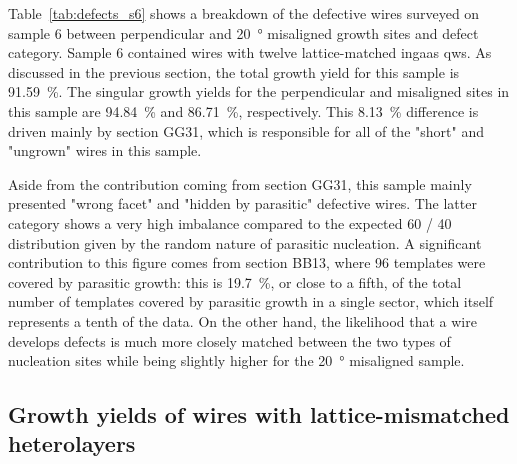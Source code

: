 Table~\ref{tab:defects_s6} shows a breakdown of the defective wires surveyed on sample 6 between perpendicular and \qty{20}{\degree} misaligned growth sites and defect category. Sample 6 contained wires with twelve lattice-matched \acs{ingaas} \acl{qw}s. As discussed in the previous section, the total growth yield for this sample is \qty{91.59}{\percent}. The singular growth yields for the perpendicular and misaligned sites in this sample are \qty{94.84}{\percent} and \qty{86.71}{\percent}, respectively. This \qty{8.13}{\percent} difference is driven mainly by section GG31, which is responsible for all of the "short" and "ungrown" wires in this sample. 

Aside from the contribution coming from section GG31, this sample mainly presented "wrong facet" and "hidden by parasitic" defective wires. The latter category shows a very high imbalance compared to the expected \num{60} / \num{40} distribution given by the random nature of parasitic nucleation. A significant contribution to this figure comes from section BB13, where \num{96} templates were covered by parasitic growth: this is \qty{19.7}{\percent}, or close to a fifth, of the total number of templates covered by parasitic growth in a single sector, which itself represents a tenth of the data. On the other hand, the likelihood that a wire develops defects is much more closely matched between the two types of nucleation sites while being slightly higher for the \qty{20}{\degree} misaligned sample.

\subsection{Growth yields of wires with lattice-mismatched heterolayers}

